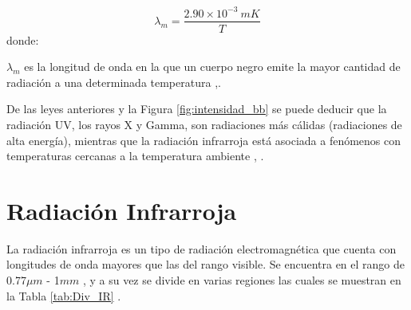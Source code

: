     \begin{equation}
        \lambda_{m} = \frac{2.90\times10^{-3}\ mK}{T}
        \label{eq:Wien}
    \end{equation}   
    donde:
    
    $\lambda_{m}$ es la longitud de onda en la que un cuerpo negro emite la mayor cantidad de radiación a una determinada temperatura \cite{Sears},\cite{FUV3}.
    
    De las leyes anteriores y la Figura \ref{fig:intensidad_bb} se puede deducir que la radiación UV, los rayos X y Gamma, son radiaciones más cálidas (radiaciones de alta energía), mientras que la radiación infrarroja está asociada a fenómenos con temperaturas cercanas a la temperatura ambiente \cite{Chang}, \cite{BlancoMDA}.     
    
    \section{Radiación Infrarroja} 
    La radiación infrarroja es un tipo de radiación electromagnética que cuenta con longitudes de onda mayores que las del rango visible. Se encuentra en el rango de 0.77$\mu m$ - 1$mm$ \cite{BlancoMDA}, y a su vez se divide en varias regiones las cuales se muestran en la Tabla \ref{tab:Div_IR} \cite{Rogalski}.
    
            \begin{table}[htbp]
                \caption{División de la radiación infrarroja.}
                \begin{center}
                \label{tab:Div_IR}
                \end{center}
            \end{table}
            

